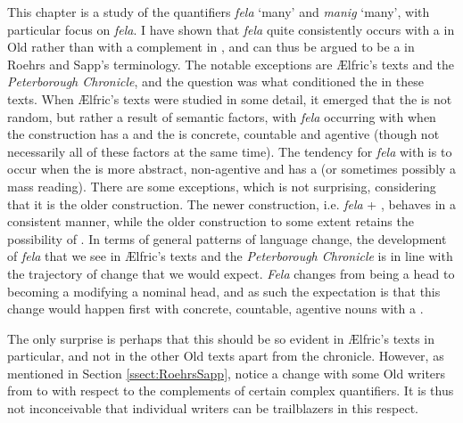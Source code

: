 \documentclass[output=paper,colorlinks,citecolor=brown]{langscibook}
\begin{document}
This chapter is a study of the quantifiers \textit{fela} ‘many’ and \textit{manig} ‘many’, with particular focus on \textit{fela}. I have shown that \textit{fela} quite consistently occurs with a   in Old  rather than with a complement in , and can thus be argued to be a  in Roehrs and Sapp’s \citeyearpar{RoehrsSapp18} terminology. The notable exceptions are Ælfric’s texts and the \textit{Peterborough Chronicle}, and the question was what conditioned the  in these texts. When Ælfric’s texts were studied in some detail, it emerged that the  is not random, but rather a result of semantic factors, with \textit{fela} occurring with  when the construction has a  and the  is concrete, countable and agentive (though not necessarily all of these factors at the same time). The tendency for \textit{fela} with  is to occur when the  is more abstract, non-agentive and has a  (or sometimes possibly a mass reading). There are some exceptions, which is not surprising, considering that it is the older construction. The newer construction, i.e. \textit{fela} + , behaves in a consistent manner, while the older construction to some extent retains the possibility of . In terms of general patterns of language change, the development of \textit{fela} that we see in Ælfric’s texts and the \textit{Peterborough Chronicle} is in line with the trajectory of change that we would expect. \textit{Fela} changes from being a head to becoming a  modifying a nominal head, and as such the expectation is that this change would happen first with concrete, countable, agentive nouns with a .  

The only surprise is perhaps that this should be so evident in Ælfric’s texts in particular, and not in the other Old  texts apart from the chronicle. However, as mentioned in Section \ref{ssect:RoehrsSapp}, \citet[417]{RoehrsSapp18} notice a change with some Old  writers from  to  with respect to the complements of certain complex quantifiers. It is thus not inconceivable that individual writers can be trailblazers in this respect.
\end{document}
